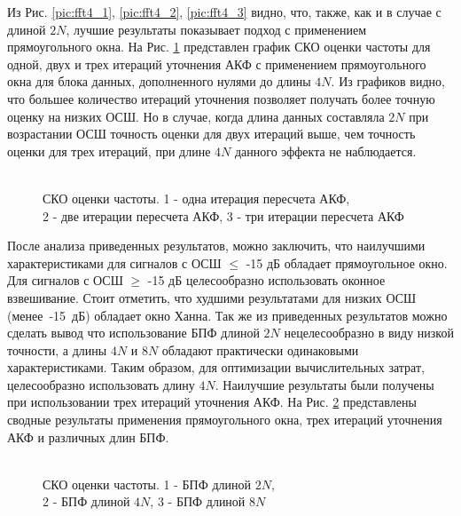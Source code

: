 Из Рис. \ref{pic:fft4_1}, \ref{pic:fft4_2}, \ref{pic:fft4_3} видно, что, также, как и в случае с длиной ${2N}$, лучшие результаты показывает подход с применением прямоугольного окна.
На Рис. \ref{pic:fft4_rect_1_2_3}
представлен график СКО оценки частоты для одной, двух и трех итераций уточнения АКФ с применением прямоугольного окна для блока данных, дополненного нулями до длины ${4N}$.
Из графиков видно, что большее количество итераций уточнения позволяет получать более точную оценку на низких ОСШ. Но в случае, когда длина данных составляла ${2N}$
при возрастании ОСШ точность оценки для двух итераций выше, чем точность оценки для трех итераций, при длине ${4N}$ данного эффекта не наблюдается.
\begin{figure}[h]
	\center{}
	\caption{\\СКО оценки частоты. 1 - одна итерация пересчета АКФ,\\2 - две итерации пересчета АКФ, 3 - три итерации пересчета АКФ}
	\label{pic:fft4_rect_1_2_3}
\end{figure}

После анализа приведенных результатов, можно заключить, что наилучшими характеристиками для сигналов с ОСШ ${\le}$ -15 дБ обладает прямоугольное окно. Для сигналов с ОСШ ${\ge}$ 
-15 дБ целесообразно использовать оконное взвешивание. Стоит отметить, что худшими результатами для низких ОСШ \mbox{(менее -15 дБ)} обладает окно Ханна.
Так же из приведенных результатов можно сделать вывод что использование БПФ длиной ${2N}$ нецелесообразно в виду низкой
точности, а длины ${4N}$ и ${8N}$ обладают практически одинаковыми характеристиками. Таким образом, для оптимизации вычислительных затрат, целесообразно использовать длину ${4N}$. Наилучшие результаты были получены при
использовании трех итераций уточнения АКФ. На Рис. \ref{pic:2vs4vs8} представлены сводные результаты применения прямоугольного окна, трех итераций уточнения АКФ и различных длин БПФ.

\begin{figure}[h]
	\center{}
	\caption{\\СКО оценки частоты. 1 - БПФ длиной ${2N}$,\\2 - БПФ длиной ${4N}$, 3 - БПФ длиной ${8N}$}
	\label{pic:2vs4vs8}
\end{figure}


